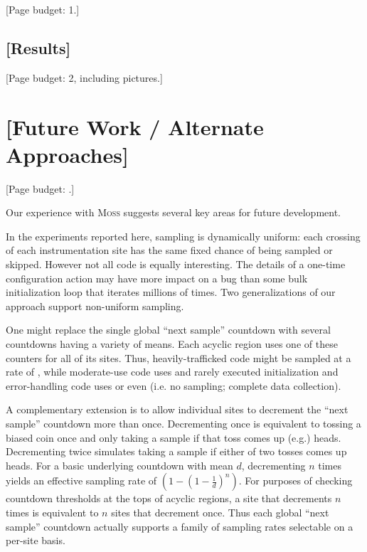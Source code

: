\documentclass{acm_proc_article-sp}
\newcommand{\moss}{\textsc{Moss}\xspace}
\newcommand{\placeholder}[1]{{\color[cmyk]{0,0.61,0.87,0}[#1]}}
\begin{document}
\placeholder{Page budget: 1.}



\subsection{\placeholder{Results}}

\placeholder{Page budget: 2, including pictures.}


\section{\placeholder{Future Work / Alternate Approaches}}

\placeholder{Page budget: .}

Our experience with \moss suggests several key areas for future
development.

In the experiments reported here, sampling is dynamically uniform:
each crossing of each instrumentation site has the same fixed chance
of being sampled or skipped.  However not all code is equally
interesting.  The details of a one-time configuration action may have
more impact on a bug than some bulk initialization loop that iterates
millions of times.  Two generalizations of our approach support
non-uniform sampling.

One might replace the single global ``next sample'' countdown with
several countdowns having a variety of means.  Each acyclic region
uses one of these counters for all of its sites.  Thus,
heavily-trafficked code might be sampled at a rate of
, while moderate-use code uses  and
rarely executed initialization and error-handling code uses
 or even  (i.e. no sampling; complete
data collection).

A complementary extension is to allow individual sites to decrement
the ``next sample'' countdown more than once.  Decrementing once is
equivalent to tossing a biased coin once and only taking a sample if
that toss comes up (e.g.) heads.  Decrementing twice simulates taking
a sample if either of two tosses comes up heads.  For a basic
underlying countdown with mean $d$, decrementing $n$ times yields an
effective sampling rate of $(1 - (1 - \frac{1}{d})^n)$.  For purposes
of checking countdown thresholds at the tops of acyclic regions, a
site that decrements $n$ times is equivalent to $n$ sites that
decrement once.  Thus each global ``next sample'' countdown actually
supports a family of sampling rates selectable on a per-site basis.
\end{document}

